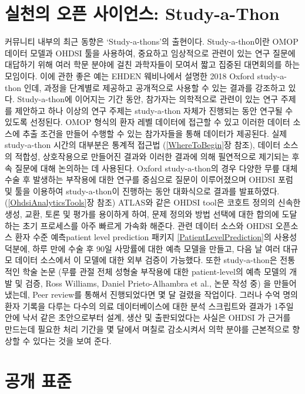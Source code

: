 \documentclass[11pt]{book}
\theoremstyle{definition}
\theoremstyle{definition}
\theoremstyle{definition}
\theoremstyle{remark}
\begin{document}
\section{실천의 오픈 사이언스: Study-a-Thon}\label{---study-a-thon}


커뮤니티 내부의 최근 동향은 `Study-a-thons'의 출현이다. Study-a-thon이란
OMOP 데이터 모델과 OHDSI 툴을 사용하여, 중요하고 임상적으로 관련이 있는
연구 질문에 대답하기 위해 여러 학문 분야에 걸친 과학자들이 모여서 짧고
집중된 대면회의를 하는 모임이다. 이에 관한 좋은 예는 EHDEN 웨비나에서
설명한 2018 Oxford study-a-thon 인데, 과정을 단계별로 제공하고
공개적으로 사용할 수 있는 결과를 강조하고 있다. Study-a-thon에 이어지는
기간 동안, 참가자는 의학적으로 관련이 있는 연구 주제를 제안하고 하나
이상의 연구 주제는 study-a-thon 자체가 진행되는 동안 연구될 수 있도록
선정된다. OMOP 형식의 환자 레벨 데이터에 접근할 수 있고 이러한 데이터
소스에 추출 조건을 만들어 수행할 수 있는 참가자들을 통해 데이터가
제공된다. 실제 study-a-thon 시간의 대부분은 통계적 접근법
(\ref{WhereToBegin}장 참조), 데이터 소스의 적합성, 상호작용으로 만들어진
결과와 이러한 결과에 의해 필연적으로 제기되는 후속 질문에 대해 논의하는
데 사용된다. Oxford study-a-thon의 경우 다양한 무릎 대체 수술 후
발생하는 부작용에 대한 연구를 중심으로 질문이 이루어졌으며 OHDSI 포럼 및
툴을 이용하여 study-a-thon이 진행하는 동안 대화식으로 결과를 발표하였다.
(\ref{OhdsiAnalyticsTools}장 참조) ATLAS와 같은 OHDSI tool은 코호트
정의의 신속한 생성, 교환, 토론 및 평가를 용이하게 하여, 문제 정의와 방법
선택에 대한 합의에 도달하는 초기 프로세스를 아주 빠르게 가속화 해준다.
관련 데이터 소스와 OHDSI 오픈소스 환자 수준 예측patient level prediction
패키지 \ref{PatientLevelPrediction}의 사용성 덕분에, 하루 만에 수술 후
90일 사망률에 대한 예측 모델을 만들고, 다음 날 여러 대규모 데이터
소스에서 이 모델에 대한 외부 검증이 가능했다. 또한 study-a-thon은
전통적인 학술 논문 (무릎 관절 전체 성형술 부작용에 대한 patient-level의
예측 모델의 개발 및 검증, Ross Williams, Daniel Prieto-Alhambra et al.,
논문 작성 중) 을 만들어 냈는데, Peer review를 통해서 진행되었다면 몇 달
걸렸을 작업이다. 그러나 수억 명의 환자 기록을 다루는 다수의 의료
데이터베이스에 대한 분석 스크립트와 결과가 1주일 안에 낙서 같은
초안으로부터 설계, 생산 및 출판되었다는 사실은 OHDSI 가 근거를 만드는데
필요한 처리 기간을 몇 달에서 며칠로 감소시켜서 의학 분야를 근본적으로
향상할 수 있다는 것을 보여 준다.

\section{공개 표준}\label{-}
\end{document}
